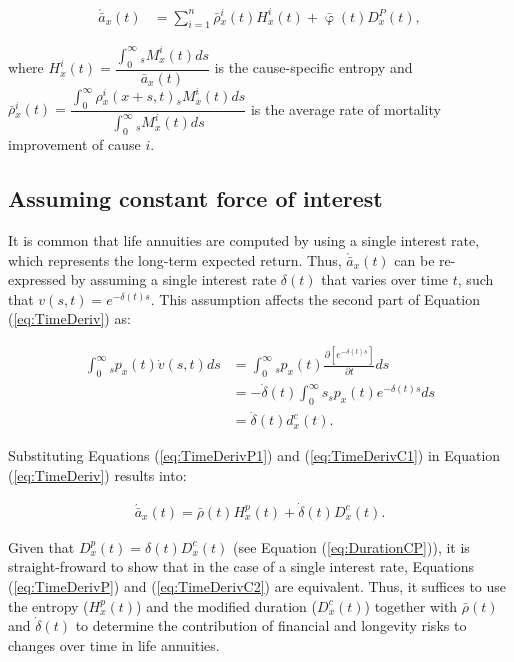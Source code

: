 \documentclass[12pt]{article}
\begin{document}
\begin{equation}\label{eq:TimeDerivCoD3}
\begin{split}
\acute{\bar{a}} _x(t) &= \sum_{i=1}^{n} \bar{\rho}{^i_x}(t){H}^{i}_x(t)+\bar{\upvarphi}(t){D}{^P_x}(t),
\end{split}
\end{equation}


where ${H}^{i}_x(t)=\dfrac{\int_{0}^{\infty}{}_sM^{i}_x(t)ds}{\bar{a} _x(t)}$ is the cause-specific entropy and $\bar{\rho}{^i_x}(t)=\dfrac{\int_{0}^{\infty}\rho{_x^i}(x+s,t) {}_sM^{i}_x(t)ds}{\int_{0}^{\infty}{}_sM^{i}_x(t)ds}$ is the average rate of mortality improvement of cause $i$.

\subsection{Assuming constant force of interest}


It is common that life annuities are computed by using a single interest rate, which represents the long-term expected return. Thus, $\acute{\bar{a}}_x(t)$ can be re-expressed by assuming a single interest rate $\delta(t)$ that varies over time $t$, such that $v(s,t)=e^{-\delta(t)s}$. This assumption affects the second part of Equation (\ref{eq:TimeDeriv}) as: 




\begin{equation}\label{eq:TimeDerivC1}
\begin{split}
\int_0^\infty {}_s{p}_x(t) \dot{v}(s,t)ds &=\int_0^\infty {}_s{p}_x(t) \frac{\partial \left[ e^{-\delta(t)s} \right]}{\partial t}ds \\
&=-\dot{\delta}(t)\int_0^\infty s  {}_s{p}_x(t) e^{-\delta(t)s} ds \\
&=  \dot{\delta}(t)  d^{c}_x(t).
\end{split}
\end{equation}

Substituting Equations (\ref{eq:TimeDerivP1}) and (\ref{eq:TimeDerivC1}) in Equation (\ref{eq:TimeDeriv}) results into: 


\begin{equation}\label{eq:TimeDerivC2}
\begin{split}
\acute{\bar{a}}_x(t) =  \bar{\rho}(t){H}^{p}_x(t)+\dot{\delta}(t)  D^{c}_x(t).
\end{split}
\end{equation}



Given that ${D}^{p}_{x}(t)=\delta(t){D}^{c}_{x}(t)$ (see Equation (\ref{eq:DurationCP})), it is straight-froward to show that in the case of a single interest rate, Equations (\ref{eq:TimeDerivP})  and (\ref{eq:TimeDerivC2}) are equivalent. Thus, it suffices to use the entropy (${H}^{p}_x(t)$) and the modified duration ($D^{c}_x(t)$) together with $\bar{\rho}(t)$ and $\dot{\delta}(t)$ to determine the contribution of financial and longevity risks to changes over time in life annuities.
\end{document}

